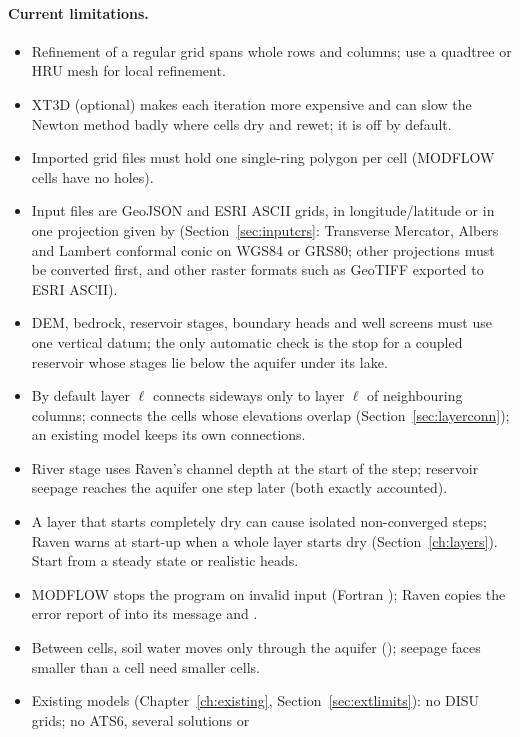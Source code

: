 \paragraph{Current limitations.}
\begin{itemize}
\item Refinement of a regular grid spans whole rows and columns; use a quadtree or HRU mesh for local refinement.
\item XT3D (optional) makes each iteration more expensive and can slow the Newton method badly where cells dry and rewet; it is off by default.
\item Imported grid files must hold one single-ring polygon per cell (MODFLOW cells have no holes).
\item Input files are GeoJSON and ESRI ASCII grids, in longitude/latitude or in one projection given by 
(Section~\ref{sec:inputcrs}: Transverse Mercator, Albers and Lambert conformal conic on WGS84 or GRS80; other projections
must be converted first, and other raster formats such as GeoTIFF exported to ESRI ASCII).
\item DEM, bedrock, reservoir stages, boundary heads and well screens must use one vertical datum; the only automatic check
is the stop for a coupled reservoir whose stages lie below the aquifer under its lake.
\item By default layer $\ell$ connects sideways only to layer $\ell$ of neighbouring columns; 
connects the cells whose elevations overlap (Section~\ref{sec:layerconn}); an existing model keeps its own connections.
\item River stage uses Raven's channel depth at the start of the step; reservoir seepage reaches the aquifer one step
later (both exactly accounted).
\item A layer that starts completely dry can cause isolated non-converged steps; Raven warns at start-up when a whole layer
starts dry (Section~\ref{ch:layers}). Start from a steady state or realistic heads.
\item MODFLOW stops the program on invalid input (Fortran ); Raven copies the error report of
 into its message and .
\item Between cells, soil water moves only through the aquifer (); seepage faces smaller than a cell
need smaller cells.
\item Existing models (Chapter~\ref{ch:existing}, Section~\ref{sec:extlimits}): no DISU grids; no ATS6, several solutions or

\end{itemize}

